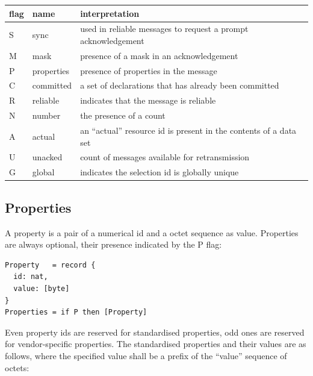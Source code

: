 \documentclass[a4paper,oneside,article]{memoir}
\begin{document}
\begin{tabu}{llX}
  flag & name       & interpretation \\ \hline
  S    & sync       & used in reliable messages to request a prompt acknowledgement \\
  M    & mask       & presence of a mask in an acknowledgement \\
  P    & properties & presence of properties in the message \\
  C    & committed  & a set of declarations that has already been committed \\
  R    & reliable   & indicates that the message is reliable \\
  N    & number     & the presence of a count \\
  A    & actual     & an ``actual'' resource id is present in the contents of a data set \\
  U    & unacked    & count of messages available for retransmission \\
  G    & global     & indicates the selection id is globally unique \\
\end{tabu}

\subsection{Properties}

A property is a pair of a numerical id and a octet sequence as value.  Properties are always
optional, their presence indicated by the P flag:
\begin{verbatim}
Property   = record {
  id: nat,
  value: [byte]
}
Properties = if P then [Property]
\end{verbatim}

Even property ids are reserved for standardised properties, odd ones are reserved for
vendor-specific properties.  The standardised properties and their values are as follows, where the
specified value shall be a prefix of the ``value'' sequence of octets:
\end{document}
